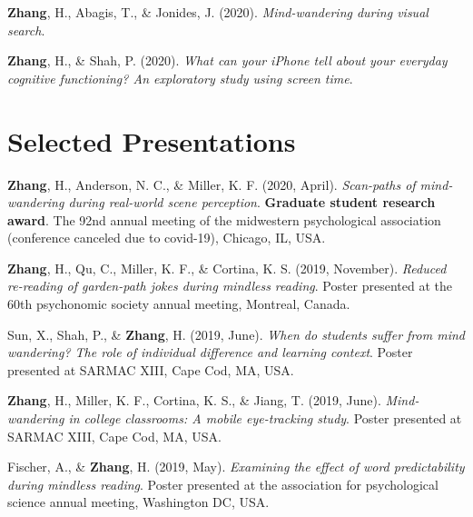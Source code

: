 \documentclass[11pt, a4paper]{awesome-cv}
\begin{document}
\begingroup
\setlength{\parindent}{-0.5in}
\setlength{\leftskip}{0.5in}

\hypertarget{refs_inprep}{}
\leavevmode\hypertarget{ref-zhang_visual_2020}{}%
\textbf{Zhang}, H., Abagis, T., \& Jonides, J. (2020).
\emph{Mind-wandering during visual search}.

\leavevmode\hypertarget{ref-zhang_what_2020}{}%
\textbf{Zhang}, H., \& Shah, P. (2020). \emph{What can your iPhone tell
about your everyday cognitive functioning? An exploratory study using
screen time}.

\endgroup

\hypertarget{selected-presentations}{%
\section{Selected Presentations}\label{selected-presentations}}

\begingroup
\setlength{\parindent}{-0.5in}
\setlength{\leftskip}{0.5in}

\hypertarget{refs_presentations}{}
\leavevmode\hypertarget{ref-zhang_scan-paths_2020}{}%
\textbf{Zhang}, H., Anderson, N. C., \& Miller, K. F. (2020, April).
\emph{Scan-paths of mind-wandering during real-world scene perception}.
\textbf{Graduate student research award}. The 92nd annual meeting of the
midwestern psychological association (conference canceled due to
covid-19), Chicago, IL, USA.

\leavevmode\hypertarget{ref-zhang_reduced_2019}{}%
\textbf{Zhang}, H., Qu, C., Miller, K. F., \& Cortina, K. S. (2019,
November). \emph{Reduced re-reading of garden-path jokes during mindless
reading}. Poster presented at the 60th psychonomic society annual
meeting, Montreal, Canada.

\leavevmode\hypertarget{ref-sun_when_2019}{}%
Sun, X., Shah, P., \& \textbf{Zhang}, H. (2019, June). \emph{When do
students suffer from mind wandering? The role of individual difference
and learning context}. Poster presented at SARMAC XIII, Cape Cod, MA,
USA.

\leavevmode\hypertarget{ref-zhang_mind-wandering_2019}{}%
\textbf{Zhang}, H., Miller, K. F., Cortina, K. S., \& Jiang, T. (2019,
June). \emph{Mind-wandering in college classrooms: A mobile eye-tracking
study}. Poster presented at SARMAC XIII, Cape Cod, MA, USA.

\leavevmode\hypertarget{ref-fischer_examining_2019}{}%
Fischer, A., \& \textbf{Zhang}, H. (2019, May). \emph{Examining the
effect of word predictability during mindless reading}. Poster presented
at the association for psychological science annual meeting, Washington
DC, USA.
\end{document}
